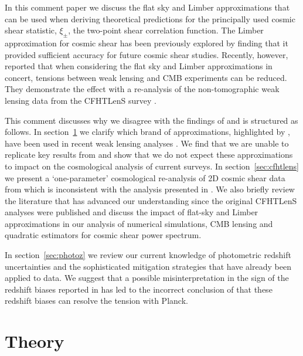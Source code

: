 \documentclass[a4paper, preprint, fleqn, usenatbib]{aastex}
\begin{document}
In this comment paper we discuss the flat sky and Limber approximations that can be used when deriving theoretical predictions for the principally used cosmic shear statistic, $\xi_\pm$, the two-point shear correlation function. The Limber approximation for cosmic shear has been previously explored by \citet{giannantonio/etal:2012} finding that it provided sufficient accuracy for future cosmic shear studies. Recently, however, \citet{kitching/etal:2016} reported that when considering the flat sky and Limber approximations in concert, tensions between weak lensing and CMB experiments can be reduced. They demonstrate the effect with a re-analysis of the non-tomographic weak lensing data from the CFHTLenS survey \citep{kilbinger/etal:2013}.    

This comment discusses why we disagree with the findings of \citet{kitching/etal:2016} and is structured as follows.  In section~\ref{sec:theory} we clarify which brand of approximations, highlighted by \citet{kitching/etal:2016}, have been used in recent weak lensing analyses \citep{joudaki/etal:2016, hildebrandt/etal:2016, joudaki/etal:2017}.  We find that we are unable to replicate key results from \citet{kitching/etal:2016} and show that we do not expect these approximations to impact on the cosmological analysis of current surveys.  In section~\ref{sec:cfhtlens} we present a `one-parameter' cosmological re-analysis of 2D cosmic shear data from \citet{kilbinger/etal:2013} which is inconsistent with the analysis presented in \citet{kitching/etal:2016}.  We also briefly review the literature that has advanced our understanding since the original CFHTLenS analyses were published and discuss the impact of flat-sky and Limber approximations in our analysis of numerical simulations, CMB lensing and quadratic estimators for cosmic shear power spectrum.

In section~\ref{sec:photoz} we review our current knowledge of photometric redshift uncertainties and the sophisticated mitigation strategies that have already been applied to data.  We suggest that a possible misinterpretation in the sign of the redshift biases reported in \citet{choi/etal:2016} has led to the incorrect conclusion of \citet{kitching/etal:2016} that these redshift biases can resolve the tension with Planck.  

\section{Theory}
\label{sec:theory}

\end{document}
